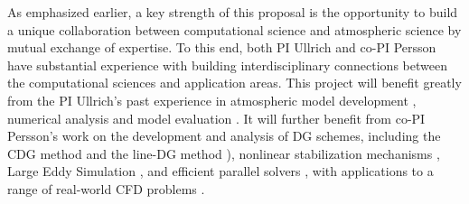 \documentclass[11pt]{article}
\begin{document}
As emphasized earlier, a key strength of this proposal is the opportunity to build a unique collaboration between computational science and atmospheric science by mutual exchange of expertise.  To this end, both PI Ullrich and co-PI Persson have substantial experience with building interdisciplinary connections between the computational sciences and application areas.  This project will benefit greatly from the PI Ullrich's past experience in atmospheric model development  \cite{PHLRDNPAU2010JCP, PAUCJBVL2010JCP, PHLPAURDN2011SPRINGER, PAUCJ2012MWR, PAUMN2012QJRMS, PAUCJ2012JCP, guba2014viscosity, ullrich2014understanding, ullrich2014global}, numerical analysis \cite{ullrich2011analysis, ullrich2012considerations} and model evaluation \cite{DCMIP2012TESTCASES, ullrich2014proposed, kent2013dynamical, ullrich2014baroclinic}.  It will further benefit from co-PI Persson's work on the development and analysis of DG schemes, including the CDG method \cite{peraire08cdg} and the line-DG method \cite{persson13linedg}), nonlinear stabilization mechanisms \cite{persson06shock}, Large Eddy Simulation \cite{uranga11iles}, and efficient parallel solvers \cite{persson08newtongmres,persson09parallel}, with applications to a range of real-world CFD problems \cite{persson09ale,peraire11dg}.




\end{document}
